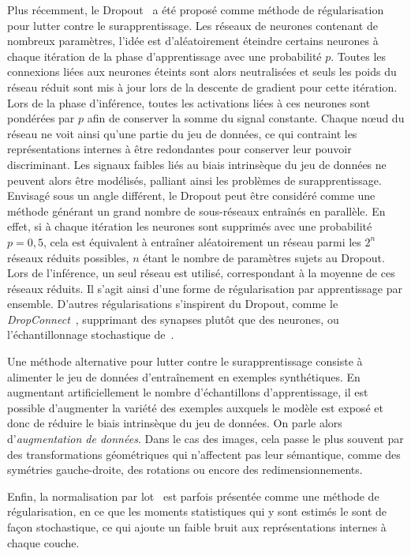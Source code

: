 Plus récemment, le Dropout~\cite{srivastava_dropout_2014} a été proposé comme méthode de régularisation pour lutter contre le surapprentissage. Les réseaux de neurones contenant de nombreux paramètres, l'idée est d'aléatoirement éteindre certains neurones à chaque itération de la phase d'apprentissage avec une probabilité $p$. Toutes les connexions liées aux neurones éteints sont alors neutralisées et seuls les poids du réseau réduit sont mis à jour lors de la descente de gradient pour cette itération. Lors de la phase d'inférence, toutes les activations liées à ces neurones sont pondérées par $p$ afin de conserver la somme du signal constante. Chaque n\oe{}ud du réseau ne voit ainsi qu'une partie du jeu de données, ce qui contraint les représentations internes à être redondantes pour conserver leur pouvoir discriminant. Les signaux faibles liés au biais intrinsèque du jeu de données ne peuvent alors être modélisés, palliant ainsi les problèmes de surapprentissage. Envisagé sous un angle différent, le Dropout peut être considéré comme une méthode générant un grand nombre de sous-réseaux entraînés en parallèle. En effet, si à chaque itération les neurones sont supprimés avec une probabilité $p = 0,5$, cela est équivalent à entraîner aléatoirement un réseau parmi les $2^n$ réseaux réduits possibles, $n$ étant le nombre de paramètres sujets au Dropout. Lors de l'inférence, un seul réseau est utilisé, correspondant à la moyenne de ces réseaux réduits. Il s'agit ainsi d'une forme de régularisation par apprentissage par ensemble. D'autres régularisations s'inspirent du Dropout, comme le \emph{DropConnect}~\cite{wan_regularization_2013}, supprimant des synapses plutôt que des neurones, ou l'échantillonnage stochastique de~\citet{zeiler_stochastic_2013}.

Une méthode alternative pour lutter contre le surapprentissage consiste à alimenter le jeu de données d'entraînement en exemples synthétiques. En augmentant artificiellement le nombre d'échantillons d'apprentissage, il est possible d'augmenter la variété des exemples auxquels le modèle est exposé et donc de réduire le biais intrinsèque du jeu de données. On parle alors d'\emph{augmentation de données}. Dans le cas des images, cela passe le plus souvent par des transformations géométriques qui n'affectent pas leur sémantique, comme des symétries gauche-droite, des rotations ou encore des redimensionnements.

Enfin, la normalisation par lot~\cite{ioffe_batch_2015} est parfois présentée comme une méthode de régularisation, en ce que les moments statistiques qui y sont estimés le sont de façon stochastique, ce qui ajoute un faible bruit aux représentations internes à chaque couche.

